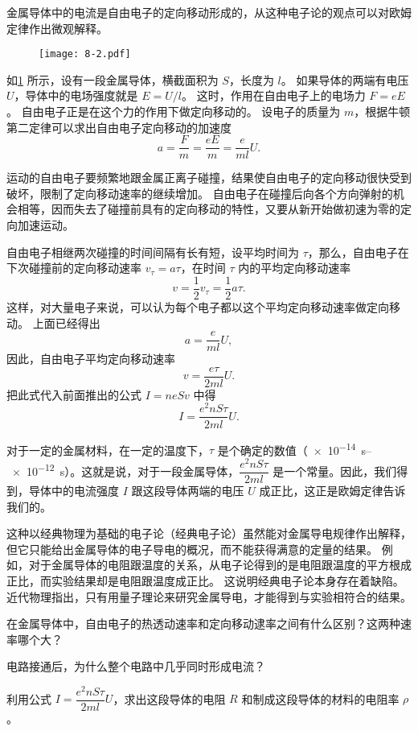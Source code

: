 金属导体中的电流是自由电子的定向移动形成的，从这种电子论的观点可以对欧姆定律作出微观解释。
\begin{figure}
  \texttt{[image: 8-2.pdf]}
  \caption{}\label{fig:8-2}
\end{figure}

如\cref{fig:8-2} 所示，设有一段金属导体，横截面积为 $S$，长度为 $l$。
如果导体的两端有电压 $U$，导体中的电场强度就是 $E=U/l$。
这时，作用在自由电子上的电场力 $F=eE$。
自由电子正是在这个力的作用下做定向移动的。
设电子的质量为 $m$，根据牛顿第二定律可以求出自由电子定向移动的加速度
\[a=\frac{F}{m}=\frac{eE}{m}=\frac{e}{ml}U.\]

运动的自由电子要频繁地跟金属正离子碰撞，结果使自由电子的定向移动很快受到破坏，限制了定向移动速率的继续增加。
自由电子在碰撞后向各个方向弹射的机会相等，因而失去了碰撞前具有的定向移动的特性，又要从新开始做初速为零的定向加速运动。

自由电子相继两次碰撞的时间间隔有长有短，设平均时间为 $\tau$，那么，自由电子在下次碰撞前的定向移动速率 $v_{\tau}=a\tau$，在时间 $\tau$ 内的平均定向移动速率
\[v=\frac{1}{2}v_{\tau}=\frac{1}{2}a\tau.\]
这样，对大量电子来说，可以认为每个电子都以这个平均定向移动速率做定向移动。
上面已经得出
\[a=\frac{e}{ml}U,\]
因此，自由电子平均定向移动速率
\[v=\frac{e\tau}{2ml}U.\]
把此式代入前面推出的公式 $I=neSv$ 中得
\[I=\frac{e^2 nS\tau}{2ml}U.\]

{\linespread{1.65}\selectfont 对于一定的金属材料，在一定的温度下，$\tau$ 是个确定的数值（\qtyrange{e-14}{e-12}{s}）。这就是说，对于一段金属导体，$\dfrac{e^2 nS\tau}{2ml}$ 是一个常量。因此，我们得到，导体中的电流强度 $I$ 跟这段导体两端的电压 $U$ 成正比，这正是欧姆定律告诉我们的。\par}

这种以经典物理为基础的电子论（经典电子论）虽然能对金属导电规律作出解释，但它只能给出金属导体的电子导电的概况，而不能获得满意的定量的结果。
例如，对于金属导体的电阻跟温度的关系，从电子论得到的是电阻跟温度的平方根成正比，而实验结果却是电阻跟温度成正比。
这说明经典电子论本身存在着缺陷。
近代物理指出，只有用量子理论来研究金属导电，才能得到与实验相符合的结果。

\begin{Practice}
\begin{question}
  \item 在金属导体中，自由电子的热透动速率和定向移动逮率之间有什么区别？这两种速率哪个大？
  \item 电路接通后，为什么整个电路中几乎同时形成电流？
  \item 利用公式 $I=\dfrac{e^2 nS\tau}{2ml}U$，求出这段导体的电阻 $R$ 和制成这段导体的材料的电阻率 $\rho$。
\end{question}
\end{Practice}

